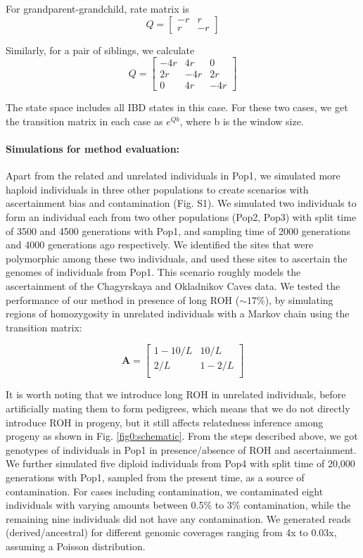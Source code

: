 \documentclass[12pt, letterpaper]{article}
\begin{document}
For grandparent-grandchild, rate matrix is
 $$Q = \left[\begin{array}
{rrr}
-r & r \\
r & -r 
\end{array}\right]$$   

Similarly, for a pair of siblings, we calculate $$Q =  
\left[\begin{array}
{rrr}
-4r & 4r & 0\\
2r & -4r & 2r\\
0 & 4r & -4r
\end{array}\right]$$   

The state space includes all IBD states in this case. For these two cases, we get the transition matrix in each case as $e^{Qb}$, where b is the window size.


\paragraph{Simulations for method evaluation:}
Apart from the related and unrelated individuals in Pop1, we simulated more haploid individuals in three other populations to create scenarios with ascertainment bias and contamination (Fig. S1). We simulated two individuals to form an individual each from two other populations (Pop2, Pop3) with split time of 3500 and 4500 generations with Pop1, and sampling time of 2000 generations and 4000 generations ago respectively.  We identified the sites that were polymorphic among these two individuals, and used these sites to ascertain the genomes of individuals from Pop1. This scenario roughly models the ascertainment of the Chagyrskaya and Okladnikov Caves data. We tested the performance of our method in presence of long ROH ($\sim17\%$), by simulating regions of homozygosity in unrelated individuals with a Markov chain using the transition matrix:

$$\mathbf{A} = \left[\begin{array}
{rr}
1-10/L & 10/L \\
2/L & 1-2/L  \\
\end{array}\right]
$$

It is worth noting that we introduce long ROH in unrelated individuals, before artificially mating them to form pedigrees, which means that we do not directly introduce ROH in progeny, but it still affects relatedness inference among progeny as shown in Fig. \ref{fig0:schematic}. 
From the steps described above, we got genotypes of individuals in Pop1 in presence/absence of ROH and ascertainment. We further simulated five diploid individuals from Pop4 with split time of 20,000 generations with Pop1, sampled from the present time, as a source of contamination.  For cases including contamination, we contaminated eight individuals with varying amounts between 0.5\% to 3\% contamination, while the remaining  nine individuals did not have any contamination. We generated reads (derived/ancestral) for different genomic coverages ranging from 4x to 0.03x, assuming a Poisson distribution.
\end{document}
